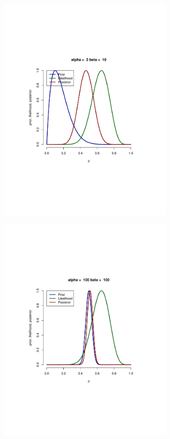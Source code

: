 \documentclass[aspectratio=169]{beamer}
\begin{document}
\begin{frame}
\includegraphics[width=3.5in]{binBayes4.pdf}
\end{frame}

\begin{frame}
\includegraphics[width=3.5in]{binBayes5.pdf}
\end{frame}
\end{document}
